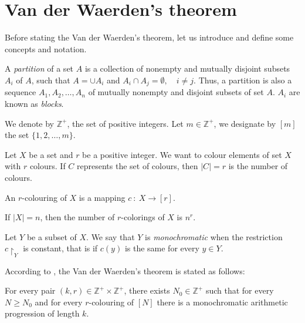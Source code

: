 \section{Van der Waerden's theorem}

Before stating the Van der Waerden's theorem, let us introduce and define some concepts and notation.

A \textit{partition} of a set $A$ is a collection of nonempty and mutually disjoint subsets $A_i$ of $A$, such that  $A=\cup A_i$ and $A_i \cap A_j=\emptyset, \quad i\neq j.$ Thus, a partition is also a sequence $A_1, A_2, \ldots, A_n$ of mutually nonempty and  disjoint subsets of set $A$. $A_i$ are known as \textit{blocks}.

We denote by $\mathbb{Z}^+$, the set of positive integers.
Let $m \in \mathbb{Z}^+$, we designate by $[m]$ the set $\{1,2, \ldots, m\}.$

Let $X$ be a set and $r$ be a positive integer. We want to colour elements of set $X$ with $r$ colours. If $C$ represents the set of colours, then $|C|=r$ is the number of colours.

\begin{defn} An $r$-colouring of $X$ is a mapping $c \ : \ X \longrightarrow [r].$  \label{rcol}\end{defn}


If $|X|=n$, then the number of $r$-colorings of $X$ is $n^r.$


Let $Y$ be a subset of $X.$ We say that $Y$ is \textit{monochromatic} when the restriction $c\restriction_Y$ is constant, that is   if $c(y)$ is the same for every $y \in Y.$


According to \cite{polymath2012new}, the Van der Waerden's theorem is stated as follows:

\begin{thm}
For every pair $(k,r) \in \mathbb{Z}^+ \times \mathbb{Z}^+$, there exists $N_0 \in \mathbb{Z}^+$ such that for every $N \geq N_0$ and for 
every $r$-colouring of $[N]$ there is a monochromatic arithmetic progression of length $k.$  \label{vd1}
\end{thm}

